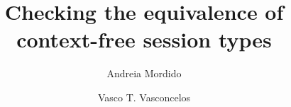 \documentclass[a4paper,UKenglish,cleveref,autoref]{lipics-v2019}
\title{Checking  the equivalence of context-free session types}
\author{Andreia Mordido}{LASIGE, Faculdade de Ciências, Universidade de Lisboa, Portugal}{afmordido@fc.ul.pt}{[funding]}{}
\author{Vasco T. Vasconcelos}{LASIGE, Faculdade de Ciências, Universidade de Lisboa, Portugal}{vmvasconcelos@fc.ul.pt}{[funding]}{}
\begin{document}
\maketitle










\label{sect:bib}



%
\end{document}
